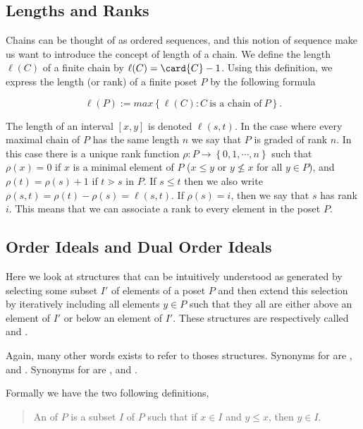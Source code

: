 \subsection*{Lengths and Ranks}

Chains can be thought of as ordered sequences, and this notion of sequence make
us want to introduce the concept of length of a chain. We define the length
$\ell(C)$ of a finite chain by $\ell(C) = \card{C} - 1$. Using this definition, we
express the length (or rank) of a finite poset $P$ by the following formula

$$\ell(P) := max\left\{{\ell(C) : C ~\text{is a chain of}~ P}\right\}.$$

The length of an interval $[x, y]$ is denoted $\ell(s, t)$. In the case where
every maximal chain of $P$ has the same length $n$ we say that $P$ is graded of
rank $n$. In this case there is a unique rank function $\rho : P \to \left\{{0,
1, \cdots , n}\right\}$ such that $\rho(x) = 0$ if $x$ is a minimal element of
$P$ ($x \le y$ or $y \nleq x$ for all $y \in P$), and $\rho(t) = \rho(s) + 1$
if $t \gtrdot s$ in $P$. If $s \le t$ then we also write $\rho(s, t) = \rho(t)
- \rho(s) = \ell(s, t)$. If $\rho(s) = i$, then we say that $s$ has rank $i$.
This means that we can associate a rank to every element in the poset $P$.


\subsection*{Order Ideals and Dual Order Ideals}

Here we look at structures that can be intuitively understood as generated by
selecting some subset $I'$ of elements of a poset $P$ and then extend this
selection by iteratively including all elements $y \in P$ such that they all
are either above an element of $I'$ or below an element of $I'$. These
structures are respectively called  and .

Again, many other words exists to refer to thoses structures. Synonyms for
 are ,  and
. Synonyms for  are
,  and .

Formally we have the two following definitions,

\begin{quotation}
An  of $P$ is a subset $I$ of $P$ such that if $x \in
I$ and $y \le x$, then $y \in I$.
\end{quotation}

